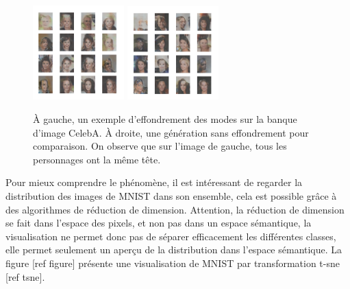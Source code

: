 \begin{figure}[!h]
\centering
\includegraphics[width=100pt]{"images/collapseB_1"}
\includegraphics[width=100pt]{"images/collapseB_2"}
\caption{À gauche, un exemple d'effondrement des modes sur la banque d'image CelebA. À droite, une génération sans effondrement pour comparaison. On observe que sur l'image de gauche, tous les personnages ont la même tête.}
\end{figure}




Pour mieux comprendre le phénomène, il est intéressant de regarder la distribution des images de MNIST dans son ensemble, cela est possible grâce à des algorithmes de réduction de dimension. Attention, la réduction de dimension se fait dans l'espace des pixels, et non pas dans un espace sémantique, la visualisation ne permet donc pas de séparer efficacement les différentes classes, elle permet seulement un aperçu de la distribution dans l'espace sémantique. La figure [ref figure] présente une visualisation de MNIST par transformation t-sne [ref tsne].

